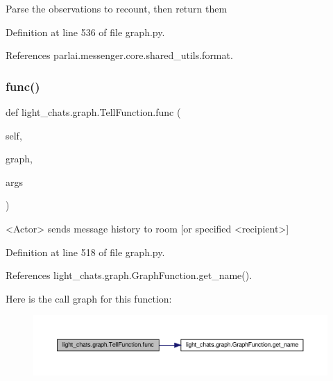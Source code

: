 \begin{DoxyVerb}Parse the observations to recount, then return them\end{DoxyVerb}
 

Definition at line 536 of file graph.\+py.



References parlai.\+messenger.\+core.\+shared\+\_\+utils.\+format.

\mbox{\label{classlight__chats_1_1graph_1_1TellFunction_a91e865e9bbba1f3ed3f01445896be21d}} 
\subsubsection{\texorpdfstring{func()}{func()}}
{\footnotesize\ttfamily def light\+\_\+chats.\+graph.\+Tell\+Function.\+func (\begin{DoxyParamCaption}\item[{}]{self,  }\item[{}]{graph,  }\item[{}]{args }\end{DoxyParamCaption})}

\begin{DoxyVerb}<Actor> sends message history to room [or specified <recipient>]\end{DoxyVerb}
 

Definition at line 518 of file graph.\+py.



References light\+\_\+chats.\+graph.\+Graph\+Function.\+get\+\_\+name().

Here is the call graph for this function\+:
\nopagebreak
\begin{figure}[H]
\begin{center}
\leavevmode
\includegraphics[width=350pt]{classlight__chats_1_1graph_1_1TellFunction_a91e865e9bbba1f3ed3f01445896be21d_cgraph}
\end{center}
\end{figure}
\mbox{\label{classlight__chats_1_1graph_1_1TellFunction_a1ce8fd5a8ee86a01e68e9115f8cc9108}} 
